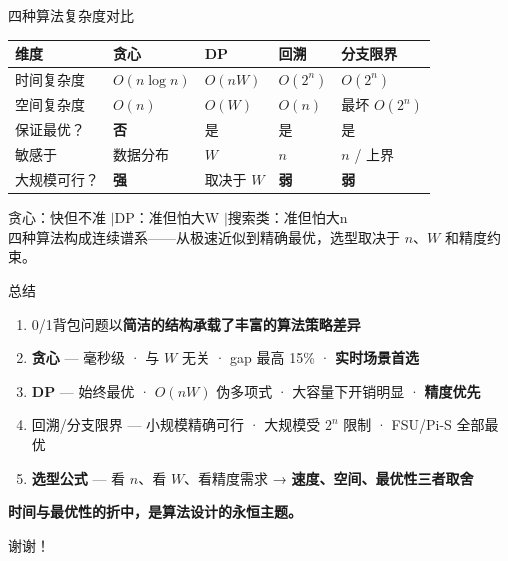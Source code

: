 \documentclass[9pt]{ctexbeamer}
\newcommand{\hi}[1]{\textcolor{ember}{\textbf{#1}}}
\newcommand{\blu}[1]{\textcolor{accent}{\textbf{#1}}}
\begin{document}
\begin{frame}{四种算法复杂度对比}

\vspace{-0.2cm}
\begin{table}
\renewcommand{\arraystretch}{1.3}
\small
\begin{tabular}{p{1.9cm}p{1.8cm}p{1.8cm}p{1.8cm}p{1.8cm}}
\toprule
\textbf{维度} & \textbf{贪心} & \textbf{DP} & \textbf{回溯} & \textbf{分支限界} \\
\midrule
时间复杂度 & $O(n\log n)$ & \hi{$O(nW)$} & $O(2^n)$ & $O(2^n)$ \\
空间复杂度 & $O(n)$ & \hi{$O(W)$} & $O(n)$ & 最坏 $O(2^n)$ \\
保证最优？ & \hi{否} & 是 & 是 & 是 \\
敏感于 & 数据分布 & $W$ & $n$ & $n$ / 上界 \\
大规模可行？ & \blu{强} & 取决于 $W$ & \hi{弱} & \hi{弱} \\
\bottomrule
\end{tabular}
\end{table}

\vspace{0.15cm}
\begin{center}
{\large\color{ink}贪心：快但不准 \quad$\mid$\quad DP：准但怕大W \quad$\mid$\quad 搜索类：准但怕大n}\\[0.2cm]
{\footnotesize\color{slate}四种算法构成连续谱系——从极速近似到精确最优，选型取决于 $n$、$W$ 和精度约束。}
\end{center}

\end{frame}

\begin{frame}{总结}

\vspace{-0.1cm}
\begin{enumerate}
  \item 0/1背包问题以\hi{简洁的结构承载了丰富的算法策略差异}

  \item \hi{贪心} — 毫秒级 · 与 $W$ 无关 · gap 最高 15\% · \blu{实时场景首选}

  \item \blu{DP} — 始终最优 · $O(nW)$ 伪多项式 · 大容量下开销明显 · \blu{精度优先}

  \item 回溯/分支限界 — 小规模精确可行 · 大规模受 $2^n$ 限制 · FSU/Pi-S 全部最优

  \item \textbf{选型公式} — 看 $n$、看 $W$、看精度需求 → \hi{速度、空间、最优性三者取舍}
\end{enumerate}

\vspace{0.3cm}
\begin{center}
{\large\color{ink}\textbf{时间与最优性的折中，是算法设计的永恒主题。}}
\end{center}

\vspace{0.15cm}
\begin{flushright}
{\footnotesize\color{rule}谢谢！}
\end{flushright}

\end{frame}
\end{document}
